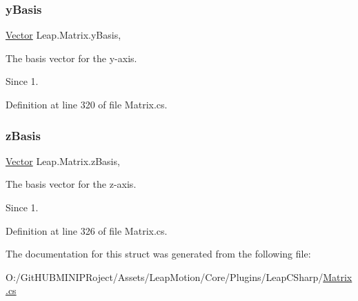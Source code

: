 \mbox{\label{struct_leap_1_1_matrix_a1349c27faa44dff7480ca0e3d4a093f0}} 
\subsubsection{\texorpdfstring{yBasis}{yBasis}}
{\footnotesize\ttfamily \mbox{\hyperlink{struct_leap_1_1_vector}{Vector}} Leap.\+Matrix.\+y\+Basis\hspace{0.3cm}{\ttfamily [get]}, {\ttfamily [set]}}



The basis vector for the y-\/axis. 

\begin{DoxySince}{Since}
1. 
\end{DoxySince}


Definition at line 320 of file Matrix.\+cs.

\mbox{\label{struct_leap_1_1_matrix_a26972992e511c04bcd5705e7d4153fd1}} 
\subsubsection{\texorpdfstring{zBasis}{zBasis}}
{\footnotesize\ttfamily \mbox{\hyperlink{struct_leap_1_1_vector}{Vector}} Leap.\+Matrix.\+z\+Basis\hspace{0.3cm}{\ttfamily [get]}, {\ttfamily [set]}}



The basis vector for the z-\/axis. 

\begin{DoxySince}{Since}
1. 
\end{DoxySince}


Definition at line 326 of file Matrix.\+cs.



The documentation for this struct was generated from the following file\+:\begin{DoxyCompactItemize}
\item 
O\+:/\+Git\+H\+U\+B\+M\+I\+N\+I\+P\+Roject/\+Assets/\+Leap\+Motion/\+Core/\+Plugins/\+Leap\+C\+Sharp/\mbox{\hyperlink{_matrix_8cs}{Matrix.\+cs}}\end{DoxyCompactItemize}
